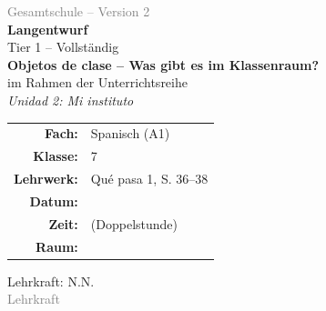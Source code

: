 \documentclass[11pt,a4paper]{article}
\newcommand{\fach}{Spanisch}
\newcommand{\jahrgangsstufe}{7}
\newcommand{\schulart}{Gesamtschule}
\newcommand{\stundenthema}{Objetos de clase -- Was gibt es im Klassenraum?}
\newcommand{\reihenthema}{Unidad 2: Mi instituto}
\newcommand{\lehrkraft}{N.N.}
\newcommand{\ausbildungsstand}{Lehrkraft}
\newcommand{\gerniveau}{A1}
\newcommand{\lehrwerk}{Qué pasa 1}
\newcommand{\lehrwerkseite}{S. 36--38}
\begin{document}
\begin{titlepage}
    \centering
    \vspace*{2cm}

    {\large\textcolor{gray}{\schulart{} -- Version 2}}\\[2cm]

    {\Huge\textcolor{fach}{\textbf{Langentwurf}}}\\[0.5cm]
    {\large Tier 1 -- Vollständig}\\[2cm]

    {\LARGE\textbf{\stundenthema}}\\[0.5cm]
    {\large im Rahmen der Unterrichtsreihe}\\[0.3cm]
    {\Large\textit{\reihenthema}}\\[2cm]

    \begin{tabular}{rl}
        \textbf{Fach:} & \fach{} (\gerniveau) \\[0.3cm]
        \textbf{Klasse:} & \jahrgangsstufe \\[0.3cm]
        \textbf{Lehrwerk:} & \lehrwerk, \lehrwerkseite \\[0.3cm]
        \textbf{Datum:} & \underline{\hspace{3cm}} \\[0.3cm]
        \textbf{Zeit:} & \underline{\hspace{3cm}} (Doppelstunde) \\[0.3cm]
        \textbf{Raum:} & \underline{\hspace{3cm}} \\[0.3cm]
    \end{tabular}

    \vfill

    {\large Lehrkraft: \lehrkraft}\\[0.3cm]
    {\normalsize\textcolor{gray}{\ausbildungsstand}}\\[1cm]

\end{titlepage}

\tableofcontents
\newpage

\end{document}

